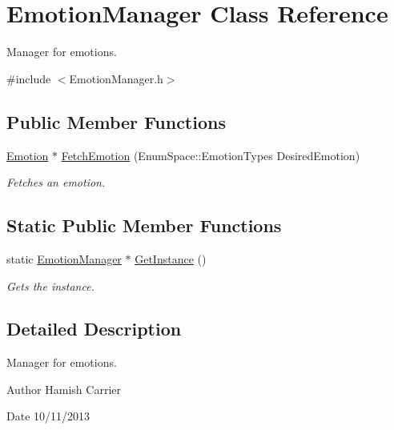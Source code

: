 \hypertarget{class_emotion_manager}{\section{Emotion\-Manager Class Reference}
\label{class_emotion_manager}
}


Manager for emotions.  




{\ttfamily \#include $<$Emotion\-Manager.\-h$>$}

\subsection*{Public Member Functions}
\begin{DoxyCompactItemize}
\item 
\hyperlink{class_emotion}{Emotion} $\ast$ \hyperlink{class_emotion_manager_a812664d891d04508b147fd7c6a1e9072}{Fetch\-Emotion} (Enum\-Space\-::\-Emotion\-Types Desired\-Emotion)
\begin{DoxyCompactList}\small\item\em Fetches an emotion. \end{DoxyCompactList}\end{DoxyCompactItemize}
\subsection*{Static Public Member Functions}
\begin{DoxyCompactItemize}
\item 
static \hyperlink{class_emotion_manager}{Emotion\-Manager} $\ast$ \hyperlink{class_emotion_manager_ade6b3cfab0145c7dff38884d85670b92}{Get\-Instance} ()
\begin{DoxyCompactList}\small\item\em Gets the instance. \end{DoxyCompactList}\end{DoxyCompactItemize}


\subsection{Detailed Description}
Manager for emotions. 

\begin{DoxyAuthor}{Author}
Hamish Carrier 
\end{DoxyAuthor}
\begin{DoxyDate}{Date}
10/11/2013 
\end{DoxyDate}


